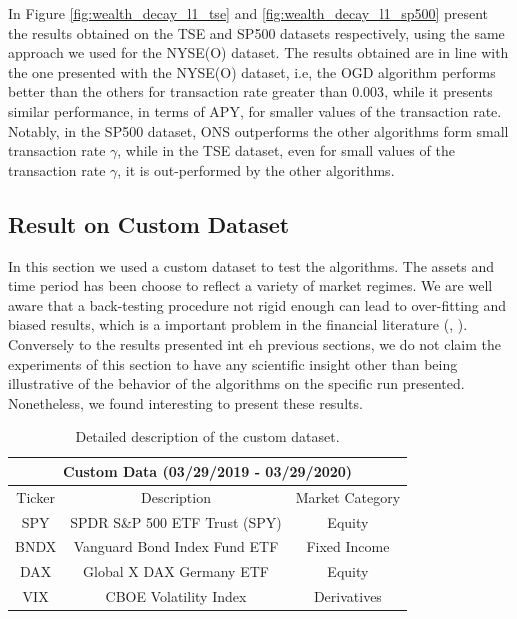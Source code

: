 In Figure \ref{fig:wealth_decay_l1_tse} and \ref{fig:wealth_decay_l1_sp500} present the results obtained on the TSE and SP500 datasets respectively, using the same approach we used for the NYSE(O) dataset.  The results obtained are in line with the one presented with the NYSE(O) dataset, i.e, the OGD algorithm performs better than the others for transaction rate greater than $0.003$, while it presents similar performance, in terms of APY, for smaller values of the transaction rate. Notably, in the SP500 dataset, ONS outperforms the other algorithms form small transaction rate $\gamma$, while in the TSE dataset, even for small values of the transaction rate $\gamma$, it is out-performed by the other algorithms.


\subsection{Result on Custom Dataset}

In this section we used a custom dataset to test the algorithms. The assets and time period has been choose to reflect a variety of market regimes. We are well aware that a back-testing procedure not rigid enough can lead to over-fitting and biased results, which is a important problem in the financial literature (\cite{bailey2016probability}, \cite{harvey2015backtesting}).
Conversely to the results presented int eh previous sections, we do not claim the experiments of this section to have any scientific insight other than being illustrative of the behavior of the algorithms on the specific run presented. Nonetheless, we found interesting to present these results. 

\begin{table}[ht!]\centering
\begin{tabular}{ |c||c|c| }
 \hline
 \multicolumn{3}{|c|}{Custom Data (03/29/2019 - 03/29/2020)} \\
 \hline
 Ticker & Description & Market Category\\
 \hline
 SPY & SPDR S\&P 500 ETF Trust (SPY)  & Equity\\
 BNDX &  Vanguard Bond Index Fund ETF & Fixed Income\\
 DAX & Global X DAX Germany ETF & Equity\\
 VIX & CBOE Volatility Index & Derivatives\\
 \hline
\end{tabular}
\caption{Detailed description of the custom dataset.}\label{tab:dataset_custom}
\end{table}

